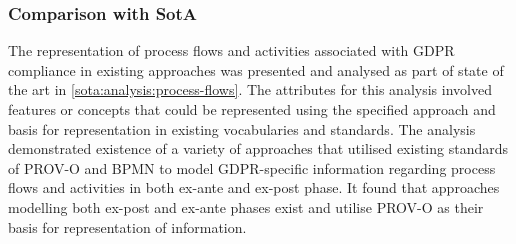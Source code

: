 \subsubsection{Comparison with SotA}
The representation of process flows and activities associated with GDPR compliance in existing approaches was presented and analysed as part of state of the art in \autoref{sota:analysis:process-flows}.
The attributes for this analysis involved features or concepts that could be represented using the specified approach and basis for representation in existing vocabularies and standards.
The analysis demonstrated existence of a variety of approaches that utilised  existing standards of PROV-O and BPMN to model GDPR-specific information regarding process flows and activities in both ex-ante and ex-post phase. It found that approaches modelling both ex-post and ex-ante phases exist and utilise PROV-O as their basis for representation of information.

